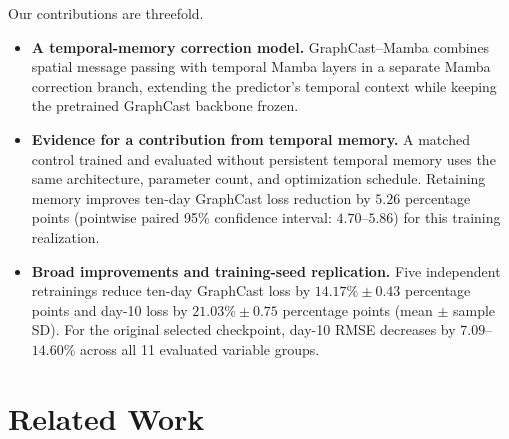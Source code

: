 \documentclass{article}
\newcommand{\vfourchange}[1]{{\color{blue}#1}}
\begin{document}
Our contributions are threefold.
\begin{itemize}
    \item \textbf{A temporal-memory correction model.} GraphCast--Mamba combines spatial message passing with temporal Mamba layers in a separate Mamba correction branch, extending the predictor's temporal context while keeping the pretrained GraphCast backbone frozen.
    \item \textbf{Evidence for a contribution from temporal memory.} \vfourchange{A matched control trained and evaluated without persistent temporal memory uses the same architecture, parameter count, and optimization schedule. Retaining memory improves ten-day GraphCast loss reduction by $5.26$ percentage points (pointwise paired 95\% confidence interval: $4.70$--$5.86$) for this training realization.}
    \item \vfourchange{\textbf{Broad improvements and training-seed replication.} Five independent retrainings reduce ten-day GraphCast loss by $14.17\%\pm0.43$ percentage points and day-10 loss by $21.03\%\pm0.75$ percentage points (mean $\pm$ sample SD). For the original selected checkpoint, day-10 RMSE decreases by $7.09$--$14.60\%$ across all 11 evaluated variable groups.}
\end{itemize}

\begingroup
\section{Related Work}
\label{sec:related_work}
\end{document}
